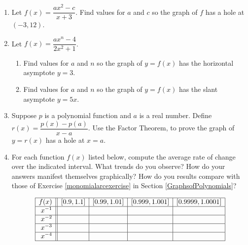 \begin{enumerate}
\item  Let $f(x) = \dfrac{ax^2-c}{x+3}$.  Find values  for $a$ and  $c$ so  the graph of $f$ has a hole  at $(-3, 12)$.

\item  Let  $f(x) = \dfrac{ax^{n} -4}{2x^2+1}$.

\begin{enumerate}

\item  Find values for $a$ and $n$ so the graph of $y = f(x)$  has the horizontal asymptote $y = 3$.

\item  Find values for $a$ and $n$ so the graph of  $y=f(x)$ has the slant asymptote $y = 5x$.

\end{enumerate}


\item  Suppose $p$ is a polynomial function and $a$ is a real number.  Define $r(x)= \dfrac{p(x) - p(a)}{x-a}$.  Use the Factor Theorem, to prove the graph of $y = r(x)$ has a hole at $x =a$.  


\item \label{laurentarcexercise}For each function $f(x)$ listed below, compute the average rate of change over the indicated interval.  What trends do you observe?  How do your answers manifest themselves graphically?  How do you results compare with those of Exercise \ref{monomialarcexercise} in Section \ref{GraphsofPolynomials}?

\vspace*{-0.2in}

\[ \begin{array}{|r||c|c|c|c|}  \hline

 f(x) &  [0.9, 1.1] & [0.99, 1.01] &[0.999, 1.001] & [0.9999, 1.0001]  \\ \hline
 x^{-1} &&&&   \\  \hline
 x^{-2} &&&&    \\  \hline
 x^{-3} &&&&   \\  \hline
 x^{-4} &&&&   \\  \hline
\end{array} \]


\end{enumerate}
